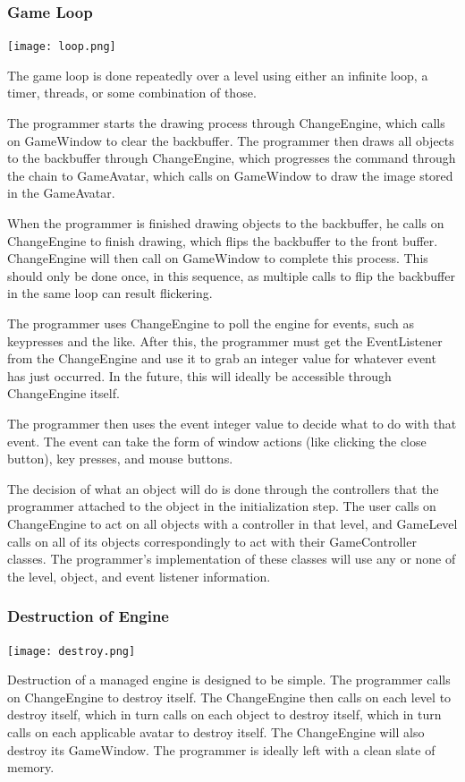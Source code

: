 \documentclass[12pt]{article}
\begin{document}
\subsubsection{Game Loop}
\texttt{[image: loop.png]}

The game loop is done repeatedly over a level using either an infinite loop, a timer, threads, or some combination of those.

The programmer starts the drawing process through ChangeEngine, which calls on GameWindow to clear the backbuffer. The programmer then draws all objects to the backbuffer through ChangeEngine, which progresses the command through the chain to GameAvatar, which calls on GameWindow to draw the image stored in the GameAvatar.

When the programmer is finished drawing objects to the backbuffer, he calls on ChangeEngine to finish drawing, which flips the backbuffer to the front buffer. ChangeEngine will then call on GameWindow to complete this process. This should only be done once, in this sequence, as multiple calls to flip the backbuffer in the same loop can result flickering.

The programmer uses ChangeEngine to poll the engine for events, such as keypresses and the like. After this, the programmer must get the EventListener from the ChangeEngine and use it to grab an integer value for whatever event has just occurred. In the future, this will ideally be accessible through ChangeEngine itself.

The programmer then uses the event integer value to decide what to do with that event. The event can take the form of window actions (like clicking the close button), key presses, and mouse buttons.

The decision of what an object will do is done through the controllers that the programmer attached to the object in the initialization step. The user calls on ChangeEngine to act on all objects with a controller in that level, and GameLevel calls on all of its objects correspondingly to act with their GameController classes. The programmer's implementation of these classes will use any or none of the level, object, and event listener information.

\subsubsection{Destruction of Engine}
\texttt{[image: destroy.png]}

Destruction of a managed engine is designed to be simple. The programmer calls on ChangeEngine to destroy itself. The ChangeEngine then calls on each level to destroy itself, which in turn calls on each object to destroy itself, which in turn calls on each applicable avatar to destroy itself. The ChangeEngine will also destroy its GameWindow. The programmer is ideally left with a clean slate of memory.
\end{document}
